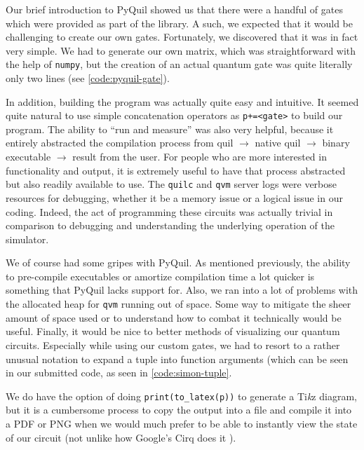 \documentclass[12pt]{article}
\begin{document}
Our brief introduction to PyQuil showed us that there were a handful of gates which were provided as part of the library.
A such, we expected that it would be challenging to create our own gates.
Fortunately, we discovered that it was in fact very simple.
We had to generate our own matrix, which was straightforward with the help of \texttt{numpy}, but the creation of an actual quantum gate was quite literally only two lines (see \autoref{code:pyquil-gate}).


In addition, building the program was actually quite easy and intuitive.
It seemed quite natural to use simple concatenation operators as \texttt{p+=<gate>} to build our program.
The ability to ``run and measure'' was also very helpful, because it entirely abstracted the compilation process from quil $\to$ native quil $\to$ binary executable $\to$ result from the user.
For people who are more interested in functionality and output, it is extremely useful to have that process abstracted but also readily available to use.
The \texttt{quilc} and \texttt{qvm} server logs were verbose resources for debugging, whether it be a memory issue or a logical issue in our coding.
Indeed, the act of programming these circuits was actually trivial in comparison to debugging and understanding the underlying operation of the simulator.

We of course had some gripes with PyQuil.
As mentioned previously, the ability to pre-compile executables or amortize compilation time a lot quicker is something that PyQuil lacks support for.
Also, we ran into a lot of problems with the allocated heap for \texttt{qvm} running out of space.
Some way to mitigate the sheer amount of space used or to understand how to combat it technically would be useful.
Finally, it would be nice to better methods of visualizing our quantum circuits.
Especially while using our custom gates, we had to resort to a rather unusual notation to expand a tuple into function arguments (which can be seen in our submitted code, as seen in \autoref{code:simon-tuple}.


We do have the option of doing \texttt{print(to\_latex(p))} to generate a Ti\textit{k}z diagram, but it is a cumbersome process to copy the output into a file and compile it into a PDF or PNG when we would much prefer to be able to instantly view the state of our circuit (not unlike how Google's Cirq does it \cite{cirq}).
\end{document}
